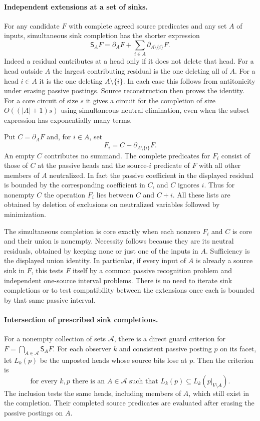 \paragraph{Independent extensions at a set of sinks.}
For any candidate $F$ with complete agreed source
predicates and any set $A$ of inputs, simultaneous
sink completion has the shorter expression
\[
 \mathsf S_AF
   =\partial_AF+
       \sum_{i\in A}\partial_{A\setminus\{i\}}F.
\]
Indeed a residual contributes at a head only if it
does not delete that head. For a head outside $A$
the largest contributing residual is the one
deleting all of $A$. For a head $i\in A$ it is the
one deleting $A\setminus\{i\}$. In each case this
follows from antitonicity under erasing passive
postings. Source reconstruction then proves the
identity. For a core circuit of size $s$ it gives
a circuit for the completion of size $O((|A|+1)s)$
using simultaneous neutral elimination, even when
the subset expression has exponentially many terms.

Put $C=\partial_AF$ and, for $i\in A$, set
\[
 F_i=C+\partial_{A\setminus\{i\}}F.
\]
An empty $C$ contributes no summand. The complete
predicates for $F_i$ consist of those of $C$ at
the passive heads and the source-$i$ predicate
of $F$ with all other members of $A$ neutralized.
In fact the passive coefficient in the displayed
residual is bounded by the corresponding coefficient
in $C$, and $C$ ignores $i$. Thus for nonempty
$C$ the operation $F_i$ lies between $C$ and $C+i$.
All these lists are obtained by deletion of
exclusions on neutralized variables followed by
minimization.

The simultaneous completion is core exactly when
each nonzero $F_i$ and $C$ is core and their union
is nonempty. Necessity follows because they are
its neutral residuals, obtained by keeping none
or just one of the inputs in $A$. Sufficiency is
the displayed union identity. In particular, if
every input of $A$ is already a source sink in
$F$, this tests $F$ itself by a common passive
recognition problem and independent one-source
interval problems. There is no need to iterate
sink completions or to test compatibility between
the extensions once each is bounded by that
same passive interval.

\paragraph{Intersection of prescribed sink completions.}
For a nonempty collection of sets $\mathcal A$,
there is a direct guard criterion for
$F=\bigcap_{A\in\mathcal A}\mathsf S_AF$.
For each observer $k$ and consistent passive
posting $p$ on its facet, let $L_k(p)$ be the
unposted heads whose source bits lose at $p$.
Then the criterion is
\[
       \text{for every }k,p\text{ there is an }A\in\mathcal A
       \text{ such that }L_k(p)\subseteq L_k(p|_{V\setminus A}).
\]
The inclusion tests the same heads, including
members of $A$, which still exist in the completion.
Their completed source predicates are evaluated
after erasing the passive postings on $A$.

